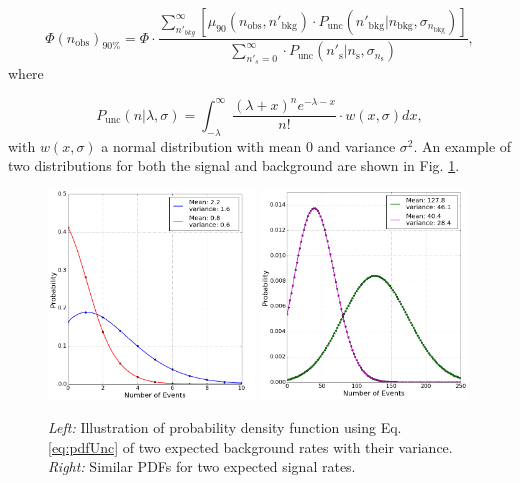 \begin{equation}
\label{eq:finalUL}
\Phi(n_\textrm{obs})_{90\%} = \Phi \cdot \frac{\sum^\infty_{n'_{bkg}} \left[ \mu_{90}\left(n_\textrm{obs},n'_\textrm{bkg} \right) \cdot P_\textrm{unc} \left(n'_\textrm{bkg}|n_\textrm{bkg},\sigma_{n_\textrm{bkg}}\right) \right]}{\sum^\infty_{n'_s = 0} \cdot P_\textrm{unc}\left(n'_\textrm{s} | n_\textrm{s}, \sigma_{n_\textrm{s}}\right)},
\end{equation}
where

\begin{equation}
\label{eq:pdfUnc}
P_\textrm{unc}\left(n|\lambda, \sigma \right) = \int^\infty_{-\lambda} \frac{\left(\lambda + x\right)^n e^{-\lambda-x}}{n!} \cdot w(x,\sigma)dx,
\end{equation}
with $w(x,\sigma)$ a normal distribution with mean 0 and variance $\sigma^2$. An example of two distributions for both the signal and background are shown in Fig. \ref{fig:pvuncertaintieswidth}.

\begin{figure}
\centering
\includegraphics[width=0.49\textwidth]{chapter8/img/PVuncertainty_asweights_background.png}
\includegraphics[width=0.49\textwidth]{chapter8/img/PVuncertainty_asweights_signal.png}
\caption{\textit{Left: }Illustration of probability density function using Eq. \ref{eq:pdfUnc} of two expected background rates with their variance. \textit{Right: }Similar PDFs for two expected signal rates.}
\label{fig:pvuncertaintieswidth}
\end{figure}


